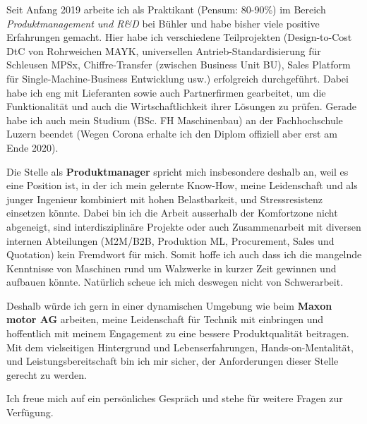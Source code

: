 \documentclass[11pt, a4paper]{awesome-cv}
\newcommand{\companyName}{Maxon motor AG}
\newcommand{\jobPosition}{Produktmanager}
\begin{document}
\makecvheader

\makelettertitle

\begin{cvletter}
	
Seit Anfang 2019 arbeite ich als Praktikant (Pensum: 80-90\%) im Bereich \textit{Produktmanagement und R\&D} bei Bühler und habe bisher viele positive Erfahrungen gemacht. Hier habe ich verschiedene Teilprojekten (Design-to-Cost DtC von Rohrweichen MAYK, universellen Antrieb-Standardisierung für Schleusen MPSx, Chiffre-Transfer (zwischen Business Unit BU), Sales Platform für Single-Machine-Business Entwicklung usw.) erfolgreich durchgeführt. Dabei habe ich eng mit Lieferanten sowie auch Partnerfirmen gearbeitet, um die Funktionalität und auch die Wirtschaftlichkeit ihrer Lösungen zu prüfen. Gerade habe ich auch mein Studium (BSc. FH Maschinenbau) an der Fachhochschule Luzern beendet (Wegen Corona erhalte ich den Diplom offiziell aber erst am Ende 2020).

Die Stelle als \textbf{\jobPosition} spricht mich insbesondere deshalb an, weil es eine Position ist, in der ich mein gelernte Know-How, meine Leidenschaft und als junger Ingenieur kombiniert mit hohen Belastbarkeit, und Stressresistenz einsetzen könnte. Dabei bin ich die Arbeit ausserhalb der Komfortzone nicht abgeneigt, sind interdisziplinäre Projekte oder auch Zusammenarbeit mit diversen internen Abteilungen (M2M/B2B, Produktion ML, Procurement, Sales und Quotation) kein Fremdwort für mich. Somit hoffe ich auch dass ich die mangelnde Kenntnisse von Maschinen rund um Walzwerke in kurzer Zeit gewinnen und aufbauen könnte. Natürlich scheue ich mich deswegen nicht von Schwerarbeit.

Deshalb würde ich gern in einer dynamischen Umgebung wie beim \textbf{\companyName} arbeiten, meine Leidenschaft für Technik mit einbringen und hoffentlich mit meinem Engagement zu eine bessere Produktqualität beitragen. Mit dem vielseitigen Hintergrund und Lebenserfahrungen, Hands-on-Mentalität, und Leistungsbereitschaft bin ich mir sicher, der Anforderungen dieser Stelle gerecht zu werden. 

Ich freue mich auf ein persönliches Gespräch und stehe für weitere Fragen zur Verfügung.

\end{cvletter}

\makeletterclosing
\end{document}
